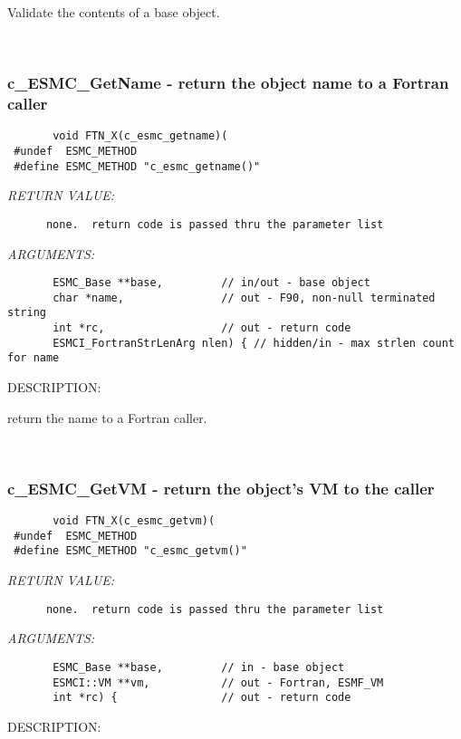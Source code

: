        Validate the contents of a base object.
   
 
\mbox{}\hrulefill\
 
\subsubsection [c\_ESMC\_GetName] {c\_ESMC\_GetName - return the object name to a Fortran caller}


  
\begin{verbatim}       void FTN_X(c_esmc_getname)(
 #undef  ESMC_METHOD
 #define ESMC_METHOD "c_esmc_getname()"\end{verbatim}{\em RETURN VALUE:}
\begin{verbatim}      none.  return code is passed thru the parameter list
   \end{verbatim}{\em ARGUMENTS:}
\begin{verbatim}       ESMC_Base **base,         // in/out - base object
       char *name,               // out - F90, non-null terminated string
       int *rc,                  // out - return code
       ESMCI_FortranStrLenArg nlen) { // hidden/in - max strlen count for name
   \end{verbatim}
{\sf DESCRIPTION:\\ }


       return the name to a Fortran caller.
   
 
\mbox{}\hrulefill\
 
\subsubsection [c\_ESMC\_GetVM] {c\_ESMC\_GetVM - return the object's VM to the caller}


  
\begin{verbatim}       void FTN_X(c_esmc_getvm)(
 #undef  ESMC_METHOD
 #define ESMC_METHOD "c_esmc_getvm()"\end{verbatim}{\em RETURN VALUE:}
\begin{verbatim}      none.  return code is passed thru the parameter list
   \end{verbatim}{\em ARGUMENTS:}
\begin{verbatim}       ESMC_Base **base,         // in - base object
       ESMCI::VM **vm,           // out - Fortran, ESMF_VM
       int *rc) {                // out - return code
   \end{verbatim}
{\sf DESCRIPTION:\\ }



